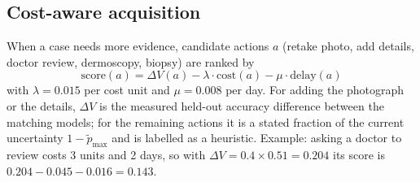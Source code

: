 \documentclass[conference]{IEEEtran}
\begin{document}
\subsection{Cost-aware acquisition}
When a case needs more evidence, candidate actions $a$ (retake photo, add details, doctor review, dermoscopy, biopsy) are ranked by
\begin{equation}
\mathrm{score}(a)=\Delta V(a)-\lambda\cdot\mathrm{cost}(a)-\mu\cdot\mathrm{delay}(a)
\label{eq:acq}
\end{equation}
with $\lambda=0.015$ per cost unit and $\mu=0.008$ per day. For adding the photograph or the details, $\Delta V$ is the measured held-out accuracy difference between the matching models; for the remaining actions it is a stated fraction of the current uncertainty $1-\tilde p_{\max}$ and is labelled as a heuristic. Example: asking a doctor to review costs 3 units and 2 days, so with $\Delta V=0.4\times0.51=0.204$ its score is $0.204-0.045-0.016=0.143$.
\end{document}

